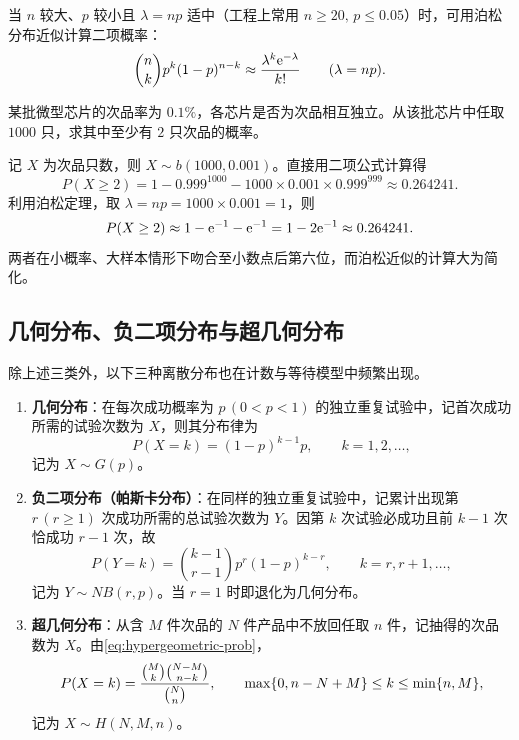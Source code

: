 当 $n$ 较大、$p$ 较小且 $\lambda=np$ 适中（工程上常用 $n\ge 20,\,p\le 0.05$）时，可用泊松分布近似计算二项概率：
\[
  \binom{n}{k}p^k(1-p)^{n-k}\approx\frac{\lambda^k\mathrm{e}^{-\lambda}}{k!}\qquad(\lambda=np).
\]

\begin{example}[title={利用泊松定理近似计算二项概率}]
\label{eg:poisson-approx}
某批微型芯片的次品率为 $0.1\%$，各芯片是否为次品相互独立。从该批芯片中任取 $1000$ 只，求其中至少有 $2$ 只次品的概率。
\begin{solution}
记 $X$ 为次品只数，则 $X\sim b(1000,0.001)$。直接用二项公式计算得
\[
  P(X\ge 2)=1-0.999^{1000}-1000\times 0.001\times 0.999^{999}\approx 0.264241.
\]
利用泊松定理，取 $\lambda=np=1000\times 0.001=1$，则
\[
  P(X\ge 2)\approx 1-\mathrm{e}^{-1}-\mathrm{e}^{-1}=1-2\mathrm{e}^{-1}\approx 0.264241.
\]
两者在小概率、大样本情形下吻合至小数点后第六位，而泊松近似的计算大为简化。
\end{solution}
\end{example}

\subsection{几何分布、负二项分布与超几何分布}

除上述三类外，以下三种离散分布也在计数与等待模型中频繁出现。

\begin{definition}
\label{def:geom-nb-hyper}
\begin{enumerate}
  \item \textbf{几何分布}：在每次成功概率为 $p\,(0<p<1)$ 的独立重复试验中，记首次成功所需的试验次数为 $X$，则其分布律为
  \begin{equation}
    P(X=k)=(1-p)^{k-1}p,\qquad k=1,2,\ldots,
    \label{eq:geometric-law}
  \end{equation}
  记为 $X\sim G(p)$。
  \item \textbf{负二项分布（帕斯卡分布）}：在同样的独立重复试验中，记累计出现第 $r\,(r\ge 1)$ 次成功所需的总试验次数为 $Y$。因第 $k$ 次试验必成功且前 $k-1$ 次恰成功 $r-1$ 次，故
  \begin{equation}
    P(Y=k)=\binom{k-1}{r-1}p^r(1-p)^{k-r},\qquad k=r,r+1,\ldots,
    \label{eq:neg-binomial-law}
  \end{equation}
  记为 $Y\sim NB(r,p)$。当 $r=1$ 时即退化为几何分布。
  \item \textbf{超几何分布}：从含 $M$ 件次品的 $N$ 件产品中不放回任取 $n$ 件，记抽得的次品数为 $X$。由\eqref{eq:hypergeometric-prob}，
  \begin{equation}
    P(X=k)=\frac{\binom{M}{k}\binom{N-M}{n-k}}{\binom{N}{n}},\qquad
    \max\{0,n-N+M\}\le k\le\min\{n,M\},
    \label{eq:hypergeometric-law}
  \end{equation}
  记为 $X\sim H(N,M,n)$。
\end{enumerate}
\end{definition}

